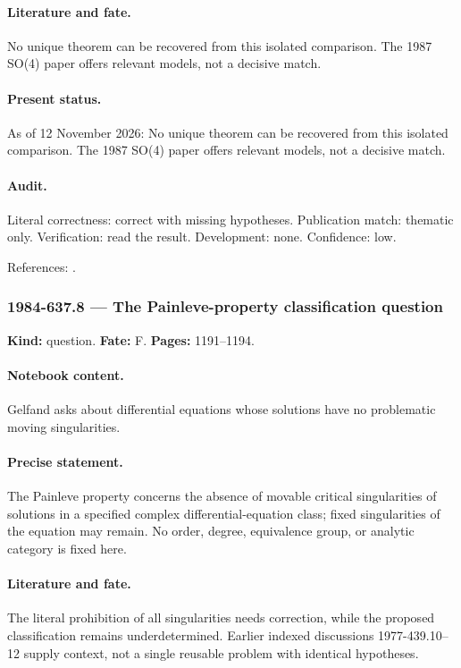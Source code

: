 \paragraph{Literature and fate.} No unique theorem can be recovered from this isolated comparison. The 1987 SO(4) paper offers relevant models, not a decisive match.

\paragraph{Present status.} As of 12 November 2026: No unique theorem can be recovered from this isolated comparison. The 1987 SO(4) paper offers relevant models, not a decisive match.

\paragraph{Audit.} Literal correctness: correct with missing hypotheses. Publication match: thematic only. Verification: read the result. Development: none. Confidence: low.

\noindent References: \citep{adler1987quadrics}.\par

\subsubsection{1984-637.8 --- The Painleve-property classification question}

\label{item:1984-637.8}

\noindent\textbf{Kind:} question. \textbf{Fate:} F. \textbf{Pages:} 1191--1194.\par

\paragraph{Notebook content.} Gelfand asks about differential equations whose solutions have no problematic moving singularities.

\paragraph{Precise statement.} The Painleve property concerns the absence of movable critical singularities of solutions in a specified complex differential-equation class; fixed singularities of the equation may remain. No order, degree, equivalence group, or analytic category is fixed here.

\paragraph{Literature and fate.} The literal prohibition of all singularities needs correction, while the proposed classification remains underdetermined. Earlier indexed discussions 1977-439.10--12 supply context, not a single reusable problem with identical hypotheses.

